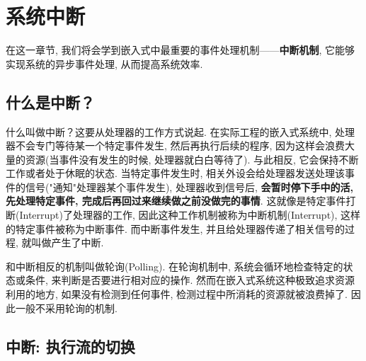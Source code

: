\chapter{系统中断}

在这一章节, 我们将会学到嵌入式中最重要的事件处理机制——\textbf{中断机制}, 它能够实现系统的异步事件处理, 从而提高系统效率.

\section{什么是中断？}
什么叫做中断？这要从处理器的工作方式说起. 在实际工程的嵌入式系统中, 处理器不会专门等待某一个特定事件发生, 然后再执行后续的程序, 因为这样会浪费大量的资源(当事件没有发生的时候, 处理器就白白等待了). 与此相反, 它会保持不断工作或者处于休眠的状态. 当特定事件发生时, 相关外设会给处理器发送处理该事件的信号("通知"处理器某个事件发生), 处理器收到信号后, \textbf{会暂时停下手中的活, 先处理特定事件, 完成后再回过来继续做之前没做完的事情}. 这就像是特定事件打断(Interrupt)了处理器的工作, 因此这种工作机制被称为中断机制(Interrupt), 这样的特定事件被称为中断事件. 而中断事件发生, 并且给处理器传递了相关信号的过程, 就叫做产生了中断.

和中断相反的机制叫做轮询(Polling). 在轮询机制中, 系统会循环地检查特定的状态或条件, 来判断是否要进行相对应的操作. 然而在嵌入式系统这种极致追求资源利用的地方, 如果没有检测到任何事件, 检测过程中所消耗的资源就被浪费掉了. 因此一般不采用轮询的机制.

\section{中断: 执行流的切换}

